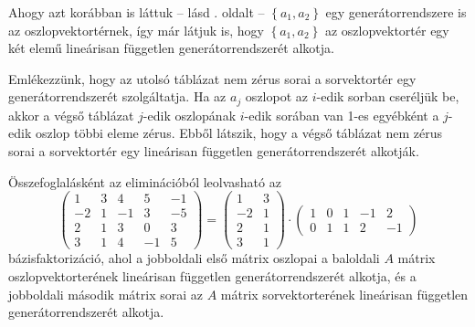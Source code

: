 \documentclass[a4paper, showtrims]{memoir}
\theoremstyle{plain}
\theoremstyle{remark}
\theoremstyle{definition}
\begin{document}
Ahogy azt korábban is láttuk -- lásd \aazt{\ref{bazisfakt}}. oldalt -- $\left\{ a_1,a_2 \right\}$ egy generátorrendszere is az oszlopvektortérnek, így már látjuk is, hogy $\left\{ a_1,a_2 \right\}$
az oszlopvektortér egy két elemű lineárisan független generátorrendszerét alkotja.

Emlékezzünk, hogy az utolsó táblázat nem zérus sorai a sorvektortér egy generátorrendszerét szolgáltatja. 
Ha az $a_j$ oszlopot az $i$-edik sorban cseréljük be, akkor a végső táblázat $j$-edik oszlopának $i$-edik sorában van 1-es egyébként a $j$-edik oszlop többi eleme zérus.
Ebből látszik, hogy a végső táblázat nem zérus sorai a sorvektortér egy lineárisan független generátorrendszerét alkotják.

Összefoglalásként az eliminációból leolvasható az
\[
	\begin{pmatrix}
		1  & 3 & 4  & 5  & -1 \\
		-2 & 1 & -1 & 3  & -5 \\
		2  & 1 & 3  & 0  & 3  \\
		3  & 1 & 4  & -1 & 5
	\end{pmatrix}
	=
	\begin{pmatrix}
		1  & 3 \\
		-2 & 1 \\
		2  & 1 \\
		3  & 1
	\end{pmatrix}
	\cdot
	\begin{pmatrix}
		1 & 0 & 1 & -1 & 2  \\
		0 & 1 & 1 & 2  & -1
	\end{pmatrix}
\]
bázisfaktorizáció, ahol a jobboldali első mátrix oszlopai a baloldali $A$ mátrix oszlopvektorterének lineárisan független generátorrendszerét alkotja, 
és a jobboldali második mátrix sorai az $A$ mátrix sorvektorterének lineárisan független generátorrendszerét alkotja.
\end{document}
